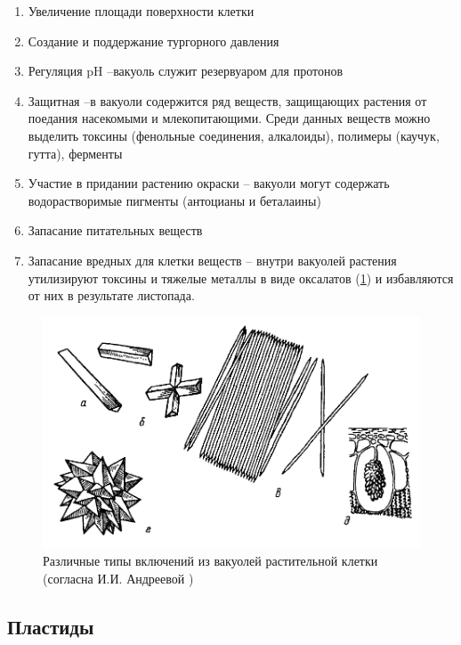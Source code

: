 \begin{enumerate}
	\item Увеличение площади поверхности клетки 
	\item Создание и поддержание тургорного давления
	\item Регуляция pH --вакуоль служит резервуаром для протонов
	\item Защитная --в вакуоли содержится ряд веществ, защищающих растения от поедания насекомыми и млекопитающими. Среди данных веществ можно выделить токсины (фенольные соединения, алкалоиды), полимеры (каучук, гутта), ферменты
	\item Участие в придании растению окраски -- вакуоли могут содержать водорастворимые пигменты (антоцианы и беталаины) 
	\item Запасание питательных веществ
	\item Запасание вредных для клетки веществ -- внутри вакуолей растения утилизируют токсины и тяжелые металлы в виде оксалатов (\ris \ref{crystals}) и избавляются от них в результате листопада.
\end{enumerate}

\begin{figure}
  \centering
       \includegraphics[width=0.5\linewidth]{pictures/crystals}
\caption{Различные типы включений из вакуолей растительной клетки (согласна И.И. Андреевой \cite{andreeva-bot})}
\label{crystals}
\end{figure}

\subsection*{Пластиды}

